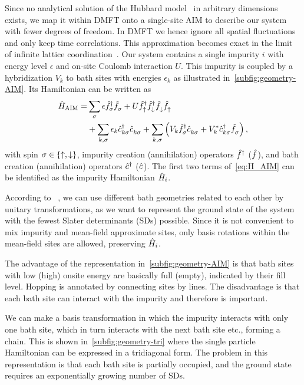 Since no analytical solution of the Hubbard model~\cite{Hubbard1964} in
arbitrary dimensions exists,
we map it within DMFT onto a single-site AIM
to describe our system with fewer degrees of freedom.
In DMFT we hence ignore all spatial fluctuations
and only keep time correlations.
This approximation becomes exact in the limit of
infinite lattice coordination~\cite{Metzner1989}.
Our system contains a single impurity $i$ with energy level $\epsilon$
and on-site Coulomb interaction $U$.
This impurity is coupled by a hybridization $V_k$ to
bath sites with energies $\epsilon_k$
as illustrated in~\cref{subfig:geometry-AIM}.
Its Hamiltonian can be written as
\begin{equation}
    \label{eq:H_AIM}
    \begin{split}
        \ham_\text{AIM}
        = & \sum_\sigma \epsilon \fdag_\sigma \ff_\sigma
        + U \fdag_\up \fdag_\dn \ff_\dn \ff_\up           \\
          & + \sum_{k, \sigma} \epsilon_k \cdag\ks \cc\ks
        + \sum_{k, \sigma} \left(V_k \fdag_{\vphantom{k}\sigma} \cc\ks
        + V_k^* \cdag\ks \ff_{\vphantom{k}\sigma} \right),
    \end{split}
\end{equation}
with spin $\sigma \in \{\uparrow, \downarrow\}$,
impurity creation (annihilation) operators $\hat{f}^\dagger$ ($\ff$),
and bath creation (annihilation) operators $\hat{c}^\dagger$ ($\cc$).
The first two terms of~\cref{eq:H_AIM} can be identified as the
impurity Hamiltonian $\hat{H}_i$.

According to \citeauthor*{Lu2014}~\cite{Lu2014},
we can use different bath geometries
related to each other by unitary transformations,
as we want to represent the ground state of the system
with the fewest Slater determinants (SDs) possible.
Since it is not convenient to mix impurity and mean-field approximate sites,
only basis rotations within the mean-field sites are allowed,
preserving $\hat{H}_i$.

The advantage of the representation in~\cref{subfig:geometry-AIM} is that bath
sites with low (high) onsite energy are
basically full (empty), indicated by their fill level.
Hopping is annotated by connecting sites by lines.
The disadvantage is that each bath site can interact with the impurity
and therefore is important.

We can make a basis transformation in which the impurity interacts with only
one bath site,
which in turn interacts with the next bath site etc., forming a chain.
This is shown in~\cref{subfig:geometry-tri}
where the single particle Hamiltonian can be expressed in a tridiagonal form.
The problem in this representation is that each bath site is partially occupied,
and the ground state requires an exponentially growing number of SDs.

